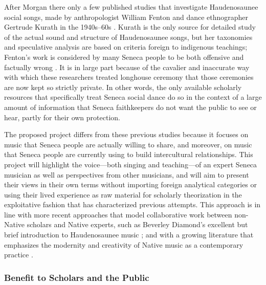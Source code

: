 \documentclass{neh}
\begin{document}
After Morgan there only a few published studies that investigate Haudenosaunee
social songs, made by anthropologist William Fenton and dance ethnographer
Gertrude Kurath in the 1940s--60s
\Autocites{FentonKurath:EagleDance}{Kurath:IroquoisMusic}{Caldwell:Kurath}.
Kurath is the only source for detailed study of the actual sound and structure
of Haudenosaunee songs, but her taxonomies and speculative analysis are based
on criteria foreign to indigenous teachings; Fenton's work is considered by
many Seneca people to be both offensive and factually wrong
\Autocite{McCarthy:Iroquoianist}.
It is in large part because of the cavalier and inaccurate way with which
these researchers treated longhouse ceremony that those ceremonies are now
kept so strictly private.
In other words, the only available scholarly resources that specifically treat
Seneca social dance do so in the context of a large amount of information that
Seneca faithkeepers do not want the public to see or hear, partly for their
own protection.

The proposed project differs from these previous studies because it focuses on
music that Seneca people are actually willing to share, and moreover, on music
that Seneca people are currently using to build intercultural relationships.
This project will highlight the voice---both singing and teaching---of an
expert Seneca musician as well as perspectives from other musicians, and will
aim to present their views in their own terms without importing foreign
analytical categories or using their lived experience as raw material for
scholarly theorization in the exploitative fashion that has characterized
previous attempts.
This approach is in line with more recent approaches that model collaborative
work between non-Native scholars and Native experts, such as Beverley
Diamond's excellent but brief introduction to Haudenosaunee music 
\Autocite{Diamond:NativeAmericanNortheast}; 
and with a growing literature that emphasizes the modernity and creativity of
Native music as a contemporary practice
\Autocites
{Browner:FirstNations}
{Browner:Heartbeat}
{LevineRobinson:MusicModernity}.

\subsubsection{Benefit to Scholars and the Public}
\end{document}
